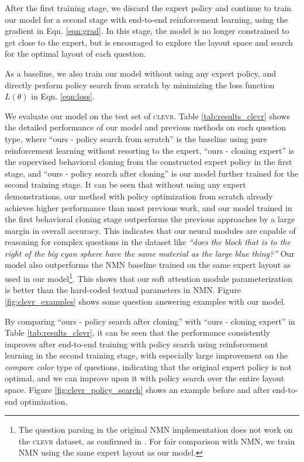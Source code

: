 \documentclass[10pt,twocolumn,letterpaper]{article}
\newcommand{\clevr}{\textsc{clevr}\xspace}
\begin{document}
After the first training stage, we discard the expert policy and continue to train our model for a second stage with end-to-end reinforcement learning, using the gradient in Eqn. \ref{eqn:grad}. In this stage, the model is no longer constrained to get close to the expert, but is encouraged to explore the layout space and search for the optimal layout of each question.

As a baseline, we also train our model without using any expert policy, and directly perform policy search from scratch by minimizing the loss function $L(\theta)$ in Eqn. \ref{eqn:loss}.

We evaluate our model on the test set of \clevr. Table \ref{tab:results_clevr} shows the detailed performance of our model and previous methods on each question type, where ``ours - policy search from scratch'' is the baseline using pure reinforcement learning without resorting to the expert, ``ours - cloning expert'' is the supervised behavioral cloning from the constructed expert policy in the first stage, and ``ours - policy search after cloning'' is our model further trained for the second training stage. It can be seen that without using any expert demonstrations, our method with policy optimization from scratch already achieves higher performance than most previous work, and our model trained in the first behavioral cloning stage outperforms the previous approaches by a large margin in overall accuracy. This indicates that our neural modules are capable of reasoning for complex questions in the dataset like \textit{``does the block that is to the right of the big cyan sphere have the same material as the large blue thing?''} Our model also outperforms the NMN baseline \cite{andreas16neural} trained on the same expert layout as used in our model\footnote{The question parsing in the original NMN implementation does not work on the \clevr dataset, as confirmed in \cite{johnson2017clevr}. For fair comparison with NMN, we train NMN using the same expert layout as our model.}. This shows that our soft attention module parameterization is better than the hard-coded textual parameters in NMN. Figure \ref{fig:clevr_examples} shows some question answering examples with our model.

By comparing ``ours - policy search after cloning'' with ``ours - cloning expert'' in Table \ref{tab:results_clevr}, it can be seen that the performance consistently improves after end-to-end training with policy search using reinforcement learning in the second training stage, with especially large improvement on the \textit{compare color} type of questions, indicating that the original expert policy is not optimal, and we can improve upon it with policy search over the entire layout space. Figure \ref{fig:clevr_policy_search} shows an example before and after end-to-end optimization.
\end{document}
